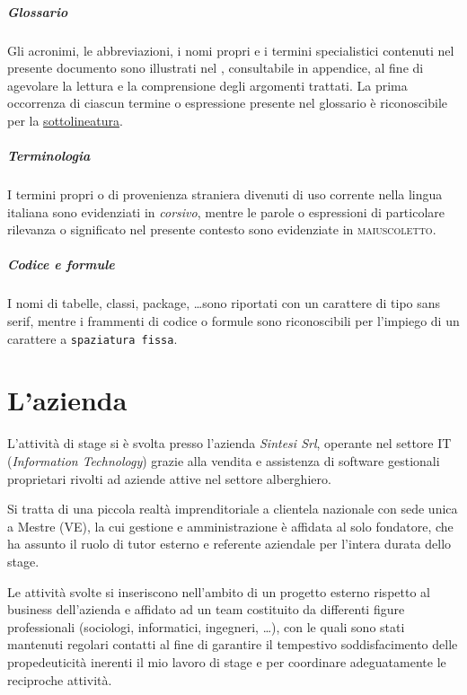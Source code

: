 \documentclass[11pt,a4paper,headsepline,hidelinks]{scrreprt} %
\begin{document}
	\paragraph{Glossario} Gli acronimi, le abbreviazioni, i nomi propri e i termini specialistici contenuti nel presente documento sono illustrati nel \textit{}, consultabile in appendice, al fine di agevolare la lettura e la comprensione degli argomenti trattati.	La prima occorrenza di ciascun termine o espressione presente nel glossario è riconoscibile per la \underline{sottolineatura}.
	
	\paragraph{Terminologia} I termini propri o di provenienza straniera divenuti di uso corrente nella lingua italiana sono evidenziati in \textit{corsivo}, mentre le parole o espressioni di particolare rilevanza o significato nel presente contesto sono evidenziate in \textsc{maiuscoletto}.
	
	\paragraph{Codice e formule} I nomi di tabelle, classi, package, \ldots sono riportati con un carattere di tipo \textsf{sans serif}, mentre i frammenti di codice o formule sono riconoscibili per l'impiego di un carattere a \texttt{spaziatura fissa}.

	\chapter{L'azienda}
	\label{ch:tesi:azienda}
	L'attività di stage si è svolta presso l'azienda \textit{Sintesi Srl}, operante nel settore IT (\textit{Information Technology}) grazie alla vendita e assistenza di software gestionali proprietari rivolti ad aziende attive nel settore alberghiero.

	Si tratta di una piccola realtà imprenditoriale a clientela nazionale con sede unica a Mestre (VE), la cui gestione e amministrazione è affidata al solo fondatore, che ha assunto il ruolo di tutor esterno e referente aziendale per l'intera durata dello stage.

	Le attività svolte si inseriscono nell'ambito di un progetto esterno rispetto al business dell'azienda e affidato ad un team costituito da differenti figure professionali (sociologi, informatici, ingegneri, \ldots), con le quali sono stati mantenuti regolari contatti al fine di garantire il tempestivo soddisfacimento delle propedeuticità inerenti il mio lavoro di stage e per coordinare adeguatamente le reciproche attività.
\end{document}
